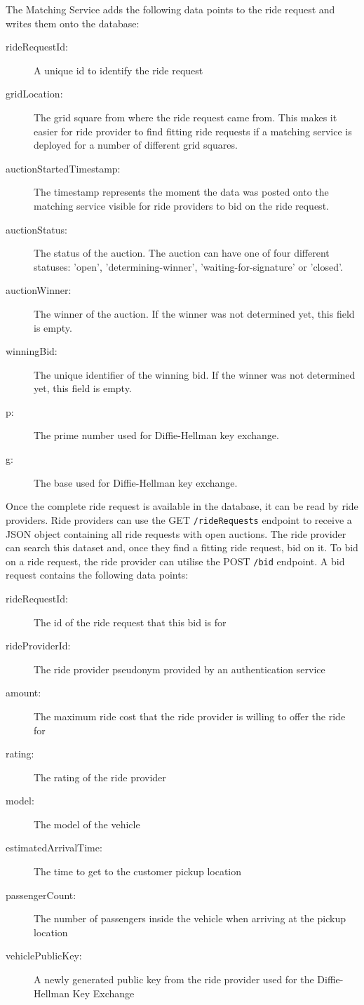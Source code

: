 The Matching Service adds the following data points to the ride request and writes them onto the database:

\begin{description}
    \item[rideRequestId:] A unique id to identify the ride request
    \item[gridLocation:] The grid square from where the ride request came from. This makes it easier for ride provider to find fitting ride requests if a matching service is deployed for a number of different grid squares.
    \item[auctionStartedTimestamp:] The timestamp represents the moment the data was posted onto the matching service visible for ride providers to bid on the ride request.
    \item[auctionStatus:] The status of the auction. The auction can have one of four different statuses: 'open', 'determining-winner', 'waiting-for-signature' or 'closed'.
    \item[auctionWinner:] The winner of the auction. If the winner was not determined yet, this field is empty.
    \item[winningBid:] The unique identifier of the winning bid. If the winner was not determined yet, this field is empty.
    \item[p:] The prime number used for Diffie-Hellman key exchange.
    \item[g:] The base used for Diffie-Hellman key exchange.
\end{description}


Once the complete ride request is available in the database, it can be read by ride providers. Ride providers can use the GET \texttt{/rideRequests} endpoint to receive a JSON object containing all ride requests with open auctions. The ride provider can search this dataset and, once they find a fitting ride request, bid on it.
To bid on a ride request, the ride provider can utilise the POST \texttt{/bid} endpoint. A bid request contains the following data points:

\begin{description}
    \item[rideRequestId:] The id of the ride request that this bid is for
    \item[rideProviderId:] The ride provider pseudonym provided by an authentication service
    \item[amount:] The maximum ride cost that the ride provider is willing to offer the ride for
    \item[rating:] The rating of the ride provider
    \item[model:] The model of the vehicle
    \item[estimatedArrivalTime:] The time to get to the customer pickup location
    \item[passengerCount:] The number of passengers inside the vehicle when arriving at the pickup location
    \item[vehiclePublicKey:] A newly generated public key from the ride provider used for the Diffie-Hellman Key Exchange 
\end{description}

